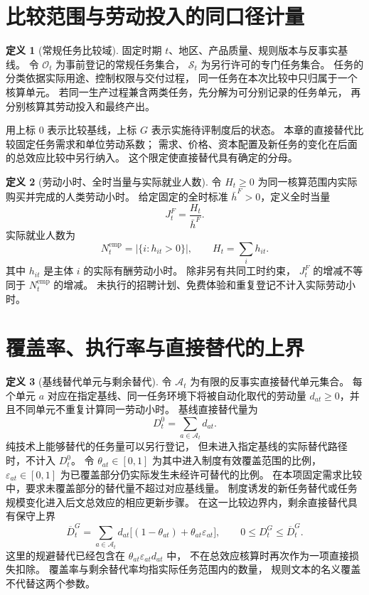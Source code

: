 \documentclass[UTF8,12pt,a4paper,openany,fontset=none,zihao=false]{ctexrep}
\theoremstyle{definition}
\newtheorem{definition}{定义}[chapter]
\newcommand{\1}{\mathbf 1}
\begin{document}
\section{比较范围与劳动投入的同口径计量}

\begin{definition}[常规任务比较域]
\label{lab:def-domain}
固定时期 \(t\)、地区、产品质量、规则版本与反事实基线。
令 \(\mathcal O_t\) 为事前登记的常规任务集合，
\(\mathcal S_t\) 为另行许可的专门任务集合。
任务的分类依据实际用途、控制权限与交付过程，
同一任务在本次比较中只归属于一个核算单元。
若同一生产过程兼含两类任务，先分解为可分别记录的任务单元，
再分别核算其劳动投入和最终产出。

用上标 \(0\) 表示比较基线，上标 \(G\) 表示实施待评制度后的状态。
本章的直接替代比较固定任务需求和单位劳动系数；
需求、价格、资本配置及新任务的变化在后面的总效应比较中另行纳入。
这个限定使直接替代具有确定的分母。
\end{definition}

\begin{definition}[劳动小时、全时当量与实际就业人数]
\label{lab:def-hours}
令 \(H_t\ge0\) 为同一核算范围内实际购买并完成的人类劳动小时。
给定固定的全时标准 \(\bar h^{F}>0\)，定义全时当量
\[
 J_t^{F}=\frac{H_t}{\bar h^{F}}.
\]
实际就业人数为
\[
 N_t^{\mathrm{emp}}
 =\left|\{i:h_{it}>0\}\right|,
 \qquad
 H_t=\sum_i h_{it}.
\]
其中 \(h_{it}\) 是主体 \(i\) 的实际有酬劳动小时。
除非另有共同工时约束，
\(J_t^{F}\) 的增减不等同于 \(N_t^{\mathrm{emp}}\) 的增减。
未执行的招聘计划、免费体验和重复登记不计入实际劳动小时。
\end{definition}

\section{覆盖率、执行率与直接替代的上界}

\begin{definition}[基线替代单元与剩余替代]
\label{lab:def-displacement}
令 \(\mathcal A_t\) 为有限的反事实直接替代单元集合。
每个单元 \(a\) 对应在指定基线、同一任务环境下将被自动化取代的劳动量
\(d_{at}\ge0\)，并且不同单元不重复计算同一劳动小时。
基线直接替代量为
\[
 D_t^0=\sum_{a\in\mathcal A_t}d_{at}.
\]
纯技术上能够替代的任务量可以另行登记，
但未进入指定基线的实际替代路径时，不计入 \(D_t^0\)。
令 \(\theta_{at}\in[0,1]\) 为其中进入制度有效覆盖范围的比例，
\(\varepsilon_{at}\in[0,1]\) 为已覆盖部分仍实际发生未经许可替代的比例。
在本项固定需求比较中，要求未覆盖部分的替代量不超过对应基线量。
制度诱发的新任务替代或任务规模变化进入后文总效应的相应更新步骤。
在这一比较边界内，剩余直接替代具有保守上界
\[
 \overline D_t^G
 =\sum_{a\in\mathcal A_t}
 d_{at}\bigl[(1-\theta_{at})+\theta_{at}\varepsilon_{at}\bigr],
 \qquad
 0\le D_t^G\le\overline D_t^G.
\]
这里的规避替代已经包含在
\(\theta_{at}\varepsilon_{at}d_{at}\) 中，
不在总效应核算时再次作为一项直接损失扣除。
覆盖率与剩余替代率均指实际任务范围内的数量，
规则文本的名义覆盖不代替这两个参数。
\end{definition}
\end{document}
